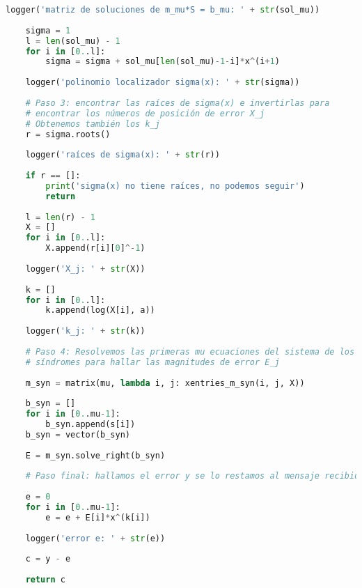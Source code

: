 \begin{lstlisting}[language=Python, caption=Implementación del algoritmo de Peterson-Gorenstein-Zierler en Sage]
    logger('matriz de soluciones de m_mu*S = b_mu: ' + str(sol_mu))
    
    sigma = 1
    l = len(sol_mu) - 1
    for i in [0..l]:
        sigma = sigma + sol_mu[len(sol_mu)-1-i]*x^(i+1)
        
    logger('polinomio localizador sigma(x): ' + str(sigma))
    
    # Paso 3: encontrar las raíces de sigma(x) e invertirlas para
    # encontrar los números de posición de error X_j
    # Obtenemos también los k_j
    r = sigma.roots()
    
    logger('raíces de sigma(x): ' + str(r))
    
    if r == []:
        print('sigma(x) no tiene raíces, no podemos seguir')
        return
    
    l = len(r) - 1
    X = []
    for i in [0..l]:
        X.append(r[i][0]^-1)
        
    logger('X_j: ' + str(X))
        
    k = []
    for i in [0..l]:
        k.append(log(X[i], a))
    
    logger('k_j: ' + str(k))
        
    # Paso 4: Resolvemos las primeras mu ecuaciones del sistema de los
    # síndromes para hallar las magnitudes de error E_j
    
    m_syn = matrix(mu, lambda i, j: xentries_m_syn(i, j, X))
    
    b_syn = []
    for i in [0..mu-1]:
        b_syn.append(s[i])
    b_syn = vector(b_syn)
    
    E = m_syn.solve_right(b_syn)
    
    # Paso final: hallamos el error y se lo restamos al mensaje recibido
    
    e = 0
    for i in [0..mu-1]:
        e = e + E[i]*x^(k[i])
    
    logger('error e: ' + str(e))
    
    c = y - e
    
    return c
\end{lstlisting}